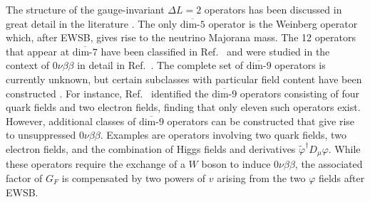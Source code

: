 \documentclass[letterpaper,11pt]{article}
\newcommand{\textoverline}[1]{$\overline{\mbox{#1}}$}
\begin{document}
The structure of the gauge-invariant $\Delta L=2$ operators has been discussed in great detail in the literature \cite{Weinberg:1979sa,Babu:2001ex,Prezeau:2003xn,deGouvea:2007qla,Lehman:2014jma,Graesser:2016bpz}. The only \textoverline{dim-5} operator is the Weinberg operator \cite{Weinberg:1979sa} which, after EWSB, gives rise to the neutrino Majorana mass.  
The 12  operators that appear at \textoverline{dim-7} have been classified in Ref.~\cite{Lehman:2014jma} and were studied in the context of $0\nu\beta\beta$ in  detail in Ref.~\cite{Cirigliano:2017djv}. The complete set of \textoverline{dim-9} operators is currently unknown, but certain subclasses with particular field content have been constructed \cite{deGouvea:2007qla,Graesser:2016bpz}. For instance, Ref.~\cite{Graesser:2016bpz} identified the \textoverline{dim-9}  operators consisting of four quark fields and two electron fields, finding that only eleven such operators exist. However, additional classes of \textoverline{dim-9}  operators can be constructed that give rise to unsuppressed $0\nu\beta\beta$. Examples are operators involving two quark fields, two electron fields, and the combination of Higgs fields and derivatives $\tilde{\varphi}^{\dagger} D_\mu \varphi$. While these operators require the exchange of a $W$ boson to induce $0\nu\beta\beta$, the associated factor of $G_F$ is compensated by two powers of $v$ arising from the two $\varphi$ fields after EWSB. 
\end{document}
